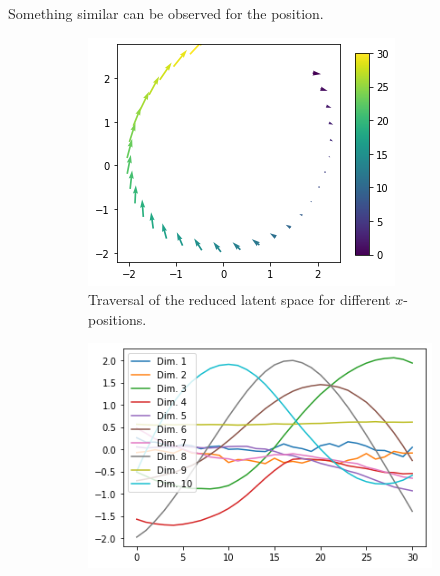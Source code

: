 Something similar can be observed for the position.
\begin{figure}
    \centering
    \begin{subfigure}{.48\textwidth}
        \includegraphics[width=\textwidth]{images/latent_space_traversals/vae_dsprites_position_latent_space_route.png}
        \caption{Traversal of the reduced latent space for different $x$-positions.}
        \label{subfig:vae_dsprites_x_pos_latent_space_route}
    \end{subfigure}
    \hfill
    \begin{subfigure}{.48\textwidth}
        \includegraphics[width=\textwidth]{images/latent_space_traversals/vae_dsprites_position_latent_space_values.png}

\end{subfigure}
\end{figure}
